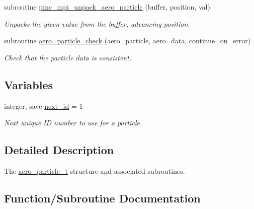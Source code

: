 \begin{DoxyCompactItemize}
subroutine \mbox{\hyperlink{namespacepmc__aero__particle_adf382d1563f3e4cece1e8602d809fd71}{pmc\+\_\+mpi\+\_\+unpack\+\_\+aero\+\_\+particle}} (buffer, position, val)
\begin{DoxyCompactList}\small\item\em Unpacks the given value from the buffer, advancing position. \end{DoxyCompactList}\item 
subroutine \mbox{\hyperlink{namespacepmc__aero__particle_ae78328884d067a525e1e163c549e1fda}{aero\+\_\+particle\+\_\+check}} (aero\+\_\+particle, aero\+\_\+data, continue\+\_\+on\+\_\+error)
\begin{DoxyCompactList}\small\item\em Check that the particle data is consistent. \end{DoxyCompactList}\end{DoxyCompactItemize}
\subsection*{Variables}
\begin{DoxyCompactItemize}
\item 
integer, save \mbox{\hyperlink{namespacepmc__aero__particle_aff614922ffabac9dab3634049c70a2a8}{next\+\_\+id}} = 1
\begin{DoxyCompactList}\small\item\em Next unique ID number to use for a particle. \end{DoxyCompactList}\end{DoxyCompactItemize}


\subsection{Detailed Description}
The \mbox{\hyperlink{structpmc__aero__particle_1_1aero__particle__t}{aero\+\_\+particle\+\_\+t}} structure and associated subroutines. 

\subsection{Function/\+Subroutine Documentation}
\mbox{\label{namespacepmc__aero__particle_a4a0f2be70516b5f8c48452c9685bd1f5}} 
